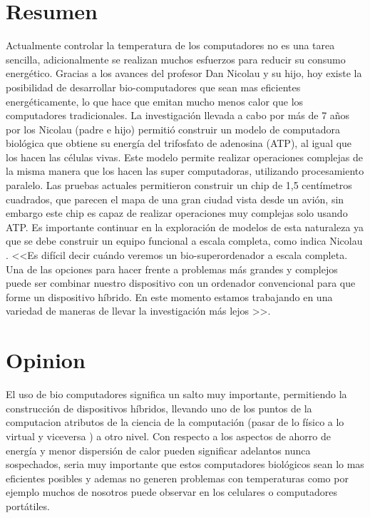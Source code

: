 \documentclass[12pt,letterpaper]{article}
\begin{document}
\section*{\centering Resumen}
Actualmente controlar la temperatura de los computadores no es una tarea sencilla\autocite{web:1}\autocite{web:2}\autocite{web:3}, adicionalmente se realizan muchos esfuerzos para reducir su consumo energético\autocite{web:4}. Gracias a los avances del profesor Dan Nicolau y su hijo, hoy existe la posibilidad de desarrollar bio-computadores que sean mas eficientes energéticamente, lo que hace que emitan mucho menos calor que los computadores tradicionales.
La investigación llevada a cabo por más de 7 años por los Nicolau (padre e hijo) permitió construir un modelo de computadora biológica que obtiene su energía del trifosfato de adenosina (ATP)\autocite{web:5}, al igual que los hacen las células vivas. Este modelo permite realizar operaciones complejas de la misma manera que los hacen las super computadoras, utilizando procesamiento paralelo.
Las pruebas actuales permitieron construir un chip de 1,5 centímetros cuadrados, que parecen el mapa de una gran ciudad vista desde un avión, sin embargo este chip es capaz de realizar operaciones muy complejas solo usando ATP.
Es importante continuar en la exploración de modelos de esta naturaleza ya que se debe construir un equipo funcional a escala completa, como indica Nicolau \autocite{web:6}. <<Es difícil decir cuándo veremos un bio-superordenador a escala completa. Una de las opciones para hacer frente a problemas más grandes y complejos puede ser combinar nuestro dispositivo con un ordenador convencional para que forme un dispositivo híbrido. En este momento estamos trabajando en una variedad de maneras de llevar la investigación más lejos >>. 


\section{Opinion}
El uso de bio computadores significa un salto muy importante, permitiendo la construcción de dispositivos híbridos, llevando uno de los puntos de la computacion atributos de la ciencia de la computación (pasar de lo físico a lo virtual y viceversa ) a otro nivel. Con respecto a los aspectos de ahorro de energía y menor dispersión de calor pueden significar adelantos nunca sospechados, seria muy importante que estos computadores biológicos sean lo mas eficientes posibles y ademas no generen problemas con temperaturas como por ejemplo muchos de nosotros puede observar en los celulares o computadores portátiles.
\end{document}
